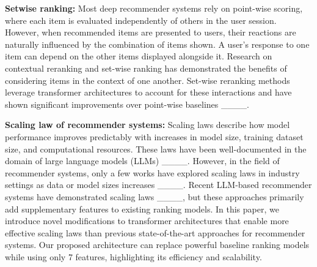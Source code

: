 \textbf{Setwise ranking:} Most deep recommender systems rely on point-wise scoring, where each item is evaluated independently of others in the user session. However, when recommended items are presented to users, their reactions are naturally influenced by the combination of items shown. A user's response to one item can depend on the other items displayed alongside it. Research on contextual reranking and set-wise ranking has demonstrated the benefits of considering items in the context of one another. Set-wise reranking methods leverage transformer architectures to account for these interactions and have shown significant improvements over point-wise baselines ____.

\textbf{Scaling law of recommender systems:}
Scaling laws describe how model performance improves predictably with increases in model size, training dataset size, and computational resources. These laws have been well-documented in the domain of large language models (LLMs) ____. However, in the field of recommender systems, only a few works have explored scaling laws in industry settings as data or model sizes increases ____.  Recent LLM-based recommender systems have demonstrated scaling laws ____, but these approaches primarily add supplementary features to existing ranking models. In this paper, we introduce novel modifications to transformer architectures that enable more effective scaling laws than previous state-of-the-art approaches for recommender systems. Our proposed architecture can replace powerful baseline ranking models while using only 7 features, highlighting its efficiency and scalability.